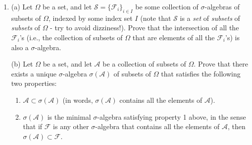 \documentclass[11pt]{report}
\providecommand{\cal}{\mathcal}
\theoremstyle{plain}
\theoremstyle{definition}
\begin{document}
\begin{enumerate}[label=\arabic*.]
\begin{equation*}
\tag{37}\label{eq:binomial}
\mathrm{P}(A_{N,k}) = \binom{N}{k} p^k (1-p)^{N-k},
\end{equation*}

is true. You may submit a short written explanation
to test your understanding, but it is not required.

(b) A group of $N$ prisoners is locked up in a
prison, each in a separate cell with no ability to
communicate with the other prisoners. Each cell
contains a mysterious on/off electrical switch. One
evening the warden visits each of the prisoners and
presents them with the following dilemma: During the
night each prisoner must choose whether to leave his
switch in the on or off position. If at midnight
\emph{exactly one} of the switches is in the on position,
all the prisoners will be set free in the morning;
otherwise they will all be executed!

The prisoners cannot coordinate their actions, but
they are all rational, know calculus and probability
theory, and each is equipped with a random number
generator. Find the strategy that the prisoners will
take to maximize their chance of survival, and compute
what that chance is, as a function of $N$ and in the
limit when $N$ is very large. For extra fun, try to
guess in advance how big or small you expect the
survival likelihood to be, and see how your guess
measures up to the actual result.

\item (a) Let $\Omega$ be a set, and let
${\cal S} = \{{\cal F}_i\}_{i\in I}$ be some
collection of $\sigma$-algebras of subsets of
$\Omega$, indexed by some index set $I$ (note that
${\cal S}$ is a \emph{set} of \emph{subsets} of \emph{subsets} of
$\Omega$ - try to avoid dizziness!). Prove that the
intersection of all the ${\cal F}_i$'s (i.e., the
collection of subsets of $\Omega$ that are elements
of all the ${\cal F}_i$'s) is also a $\sigma$-algebra.

(b) Let $\Omega$ be a set, and let ${\cal A}$ be a
collection of subsets of $\Omega$. Prove that there
exists a unique $\sigma$-algebra $\sigma({\cal A})$
of subsets of $\Omega$ that satisfies the following
two properties:

\begin{enumerate}[label=(\roman*)]
\item ${\cal A} \subset \sigma({\cal A})$ (in words,
$\sigma({\cal A})$ contains all the elements of
${\cal A}$).

\item $\sigma({\cal A})$ is the minimal $\sigma$-algebra
satisfying property 1 above, in the sense that if
${\cal F}$ is any other $\sigma$-algebra that
contains all the elements of ${\cal A}$, then
$\sigma({\cal A}) \subset {\cal F}$.
\end{enumerate}


\end{enumerate}
\end{document}
